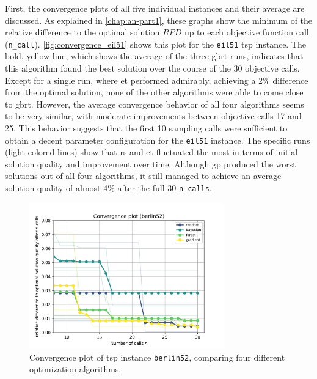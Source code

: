 First, the convergence plots of all five individual instances and their average are discussed. As explained in \cref{chap:an-part1}, these graphs show the minimum of the relative difference to the optimal solution $RPD$ up to each objective function call (\texttt{n\_call}). \cref{fig:convergence_eil51} shows this plot for the \texttt{eil51} \gls{tsp} instance. The bold, yellow line, which shows the average of the three \gls{gbrt} runs, indicates that this algorithm found the best solution over the course of the 30 objective calls. Except for a single run, where \gls{et} performed admirably, achieving a 2\% difference from the optimal solution, none of the other algorithms were able to come close to \gls{gbrt}. However, the average convergence behavior of all four algorithms seems to be very similar, with moderate improvements between objective calls 17 and 25. This behavior suggests that the first 10 sampling calls were sufficient to obtain a decent parameter configuration for the \texttt{eil51} instance. The specific runs (light colored lines) show that \gls{rs} and \gls{et} fluctuated the most in terms of initial solution quality and improvement over time. Although \gls{gp} produced the worst solutions out of all four algorithms, it still managed to achieve an average solution quality of almost 4\% after the full 30 \texttt{n\_calls}.

\begin{figure}[h]
	\centering
	\includegraphics[width=0.75\textwidth]{results/part1/convergence_berlin52.png}
	\caption[Convergence plot of \gls{tsp} instance \texttt{berlin52}]{Convergence plot of \gls{tsp} instance \texttt{berlin52}, comparing four different optimization algorithms.}
	\label{fig:convergence_berlin52}
\end{figure}

